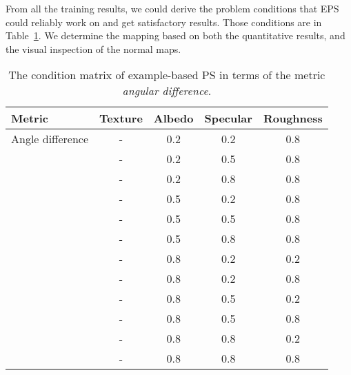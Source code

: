 From all the training results, we could derive the problem conditions that EPS could reliably work on and get satisfactory results. Those conditions are in Table~\ref{tab:ps_training_result}. We determine the mapping based on both the quantitative results, and the visual inspection of the normal maps.
\begin{table}[!htbp]
  \centering
  \begin{tabular}{l*{4}{c}}
  \hline
  \textbf{Metric} & Texture & Albedo & Specular & Roughness\\
  \hline
  Angle difference & - & 0.2 & 0.2 & 0.8\\
                   & - & 0.2 & 0.5 & 0.8\\
                   & - & 0.2 & 0.8 & 0.8\\
                   & - & 0.5 & 0.2 & 0.8\\
                   & - & 0.5 & 0.5 & 0.8\\
                   & - & 0.5 & 0.8 & 0.8\\
                   & - & 0.8 & 0.2 & 0.2\\ %
                   & - & 0.8 & 0.2 & 0.8\\
                   & - & 0.8 & 0.5 & 0.2\\
                   & - & 0.8 & 0.5 & 0.8\\
                   & - & 0.8 & 0.8 & 0.2\\ %
                   & - & 0.8 & 0.8 & 0.8\\
  \hline
  \end{tabular}
  \caption{The condition matrix of example-based PS in terms of the metric \textit{angular difference}.}
  \label{tab:ps_training_result}
\end{table}

